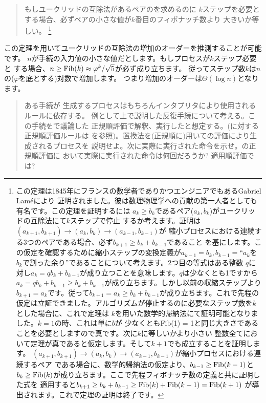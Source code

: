 \begin{quote}
もしユークリッドの互除法があるペアのを求めるのに
\( k \)ステップを必要とする場合、必ずペアの小さな値が\( k \)番目のフィボナッチ数より
大きいか等しい。
\footnote{この定理は1845年にフランスの数学者でありかつエンジニアでもあるGabriel Lam\'eにより
証明されました。彼は数理物理学への貢献の第一人者としても有名です。この定理を証明するには
\( a_k \ge b_k \)であるペア(\( a_k, b_k \))がユークリッドの互除法にて\( k \)ステップで停止
するか考えます。証明は\( (a_{k+1}, b_{k+1}) \to (a_k, b_k) \to (a_{k-1}, b_{k-1}) \)が
縮小プロセスにおける連続する3つのペアである場合、必ず\( b_{k+1} \ge b_k + b_{k-1} \)であること
を基にします。この仮定を確認するために縮小ステップの変換定義が\( a_{k-1} = b_k, b_{k-1} =  \)``\( a_k \)を
\( b_k \)で割った余り''であることについて考えます。2つ目の等式はある整数
\( q \)に対し\( a_k = qb_k + b_{k-1} \)が成り立つことを意味します。\( q \)は少なくとも1ですから
\( a_k = qb_k + b_{k-1} \ge b_k + b_{k-1} \)が成り立ちます。しかし以前の収縮ステップより
\( b_{k+1} = a_k \)です。従って\( b_{k+1} = a_k \ge b_k + b_{k-1} \)が成り立ちます。これで先程の
仮定は立証できました。アルゴリズムが停止するのに必要なステップ数を\( k \)とした場合に、これで定理は
\( k \)を用いた数学的帰納法にて証明可能となりました。\( k = 1 \)の時、これは単に\( b \)が
少なくともFib(1) = 1と同じ大きさであることを必要としますので真です。次に\( k \)に等しいかより小さい
整数全てにおいて定理が真であると仮定します。そして\( k + 1 \)でも成立することを証明します。
\( (a_{k+1}, b_{k+1}) \to (a_k, b_k) \to (a_{k-1}, b_{k-1}) \)が縮小プロセスにおける連続するペア
である場合に、数学的帰納法の仮定より、\( b_{k-1} \ge {\rm Fib}(k - 1) \)と
\( b_k \ge {\rm Fib}(k) \)が成り立ちます。ここで先程フィボナッチ数の定義と共に証明した式を
適用すると\( b_{k+1} \ge b_k + b_{k-1} \ge {\rm Fib}(k) + {\rm Fib}(k-1) = {\rm Fib}(k+1) \)
が導出されます。これで定理の証明は終了です。
}

\end{quote}

\noindent
この定理を用いてユークリッドの互除法の増加のオーダーを推測することが可能です。
\( n \)が手続の入力値の小さな値だとします。もしプロセスが\( k \)ステップ必要と
する場合、\( n \ge {\rm Fib}(k) \approx \varphi^k / \sqrt{5} \)が必ず成り立ちます。
従ってステップ数\( k \)は\( n \)の(\( \varphi \)を底とする)対数で増加します。
つまり増加のオーダーは\( \Theta(\log n) \)となります。


\begin{quote}
 ある手続が
生成するプロセスはもちろんインタプリタにより使用されるルールに依存する。
例として上で説明した反復手続について考える。この手続をで議論した
正規順評価で解釈、実行したと想定する。(に対する正規順評価ルールは
を参照)。置換法を(正規順に)用いての評価により生成されるプロセスを
説明せよ。次に実際に実行された命令を示せ。の正規順評価に
おいて実際に実行された命令は何回だろうか? 適用順評価では?
\end{quote}


